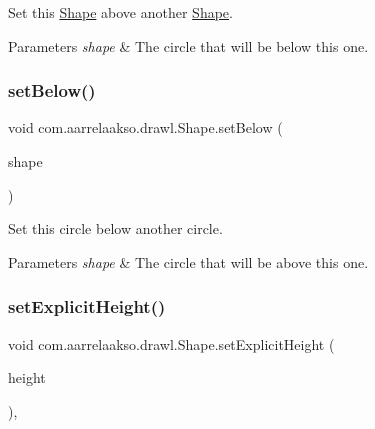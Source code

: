 Set this \hyperlink{classcom_1_1aarrelaakso_1_1drawl_1_1_shape}{Shape} above another \hyperlink{classcom_1_1aarrelaakso_1_1drawl_1_1_shape}{Shape}. 


\begin{DoxyParams}{Parameters}
{\em shape} & The circle that will be below this one. \\
\hline
\end{DoxyParams}
\mbox{\label{classcom_1_1aarrelaakso_1_1drawl_1_1_shape_aa0ec0030515b5096820e4dd030c0b320}} 
\subsubsection{\texorpdfstring{set\+Below()}{setBelow()}}
{\footnotesize\ttfamily void com.\+aarrelaakso.\+drawl.\+Shape.\+set\+Below (\begin{DoxyParamCaption}\item[{\hyperlink{classcom_1_1aarrelaakso_1_1drawl_1_1_shape}{Shape}}]{shape }\end{DoxyParamCaption})\hspace{0.3cm}{\ttfamily [inherited]}}



Set this circle below another circle. 


\begin{DoxyParams}{Parameters}
{\em shape} & The circle that will be above this one. \\
\hline
\end{DoxyParams}
\mbox{\label{classcom_1_1aarrelaakso_1_1drawl_1_1_shape_a37e0c4b85c07c4c87a24609ae1cb50a5}} 
\subsubsection{\texorpdfstring{set\+Explicit\+Height()}{setExplicitHeight()}}
{\footnotesize\ttfamily void com.\+aarrelaakso.\+drawl.\+Shape.\+set\+Explicit\+Height (\begin{DoxyParamCaption}\item[{@Nullable \hyperlink{classcom_1_1aarrelaakso_1_1drawl_1_1_sisu_big_decimal}{Sisu\+Big\+Decimal}}]{height }\end{DoxyParamCaption})\hspace{0.3cm}{\ttfamily [protected]}, {\ttfamily [inherited]}}



